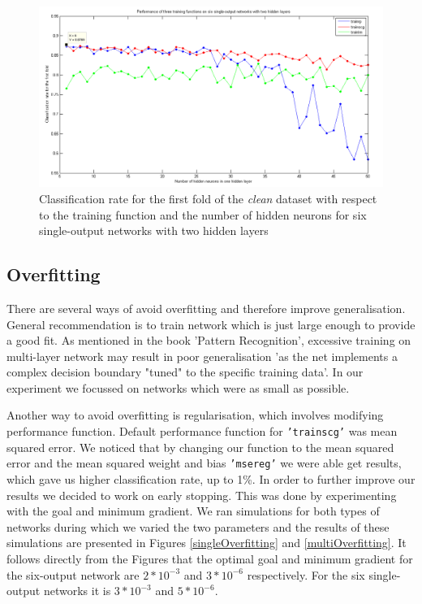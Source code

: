 \documentclass[a4paper]{article}
\begin{document}
\begin{figure}[H]
\center
\includegraphics[width=1\columnwidth]{singleOutput2layer}
\caption{Classification rate for the first fold of the \emph{clean} dataset with respect to the training function and the number of hidden neurons for six single-output networks with two hidden layers}
\label{singleOutput2layer}
\end{figure}

\clearpage

\subsection{Overfitting}

There are several ways of avoid overfitting and therefore improve generalisation. General recommendation is to train network which is just large enough to provide a good fit. As mentioned in the book 'Pattern Recognition', excessive training on multi-layer network may result in poor generalisation 'as the net implements a complex decision boundary "tuned" to the specific training data'. In our experiment we focussed on networks which were as small as possible. \medskip

Another way to avoid overfitting is regularisation, which involves modifying performance function. Default performance function for \texttt{'trainscg'} was mean squared error. We noticed that by changing our function to the mean squared error and the mean squared weight and bias \texttt{'msereg'} we were able get results, which gave us higher classification rate, up to 1\%. In order to further improve our results we decided to work on early stopping. This was done by experimenting with the goal and minimum gradient. We ran simulations for both types of networks during which we varied the two parameters and the results of these simulations are presented in Figures \ref{singleOverfitting} and \ref{multiOverfitting}. It follows directly from the Figures that the optimal goal and minimum gradient for the six-output network are $2*10^{-3}$ and $3*10^{-6}$ respectively. For the six single-output networks it is $3*10^{-3}$ and $5*10^{-6}$.
\end{document}
